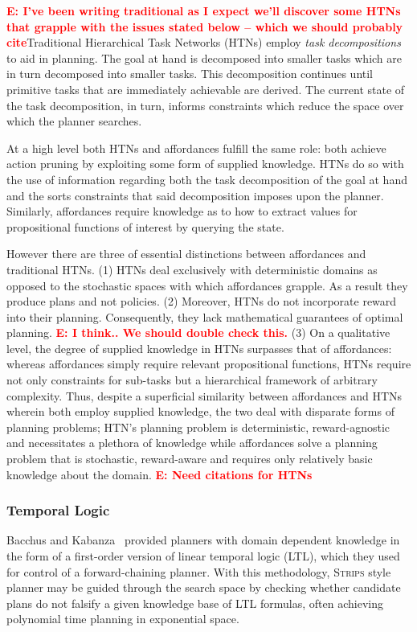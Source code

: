 \documentclass[conference]{IEEEtran}
\newcommand{\enote}[1]{\textcolor{Red}{\textbf{E: #1}}}
\begin{document}
\enote{I've been writing traditional as I expect we'll discover some HTNs that grapple with the issues stated below -- which we should probably cite}Traditional Hierarchical Task Networks (HTNs) employ \textit{task decompositions} to aid in planning. The goal at hand is decomposed into smaller tasks which are in turn decomposed into smaller tasks. This decomposition continues until primitive tasks that are immediately achievable are derived. The current state of the task decomposition, in turn, informs constraints which reduce the space over which the planner searches.

At a high level both HTNs and affordances fulfill the same role: both achieve action pruning by exploiting some form of supplied knowledge. HTNs do so with the use of information regarding both the task decomposition of the goal at hand and the sorts constraints that said decomposition imposes upon the planner. Similarly, affordances require knowledge as to how to extract values for propositional functions of interest by querying the state.

However there are three of essential distinctions between affordances and traditional HTNs. (1) HTNs deal exclusively with deterministic domains as opposed to the stochastic spaces with which affordances grapple. As a result they produce plans and not policies. (2) Moreover, HTNs do not incorporate reward into their planning. Consequently, they lack mathematical guarantees of optimal planning. \enote{I think.. We should double check this.} (3) On a qualitative level, the degree of supplied knowledge in HTNs surpasses that of affordances: whereas affordances simply require relevant propositional functions, HTNs require not only constraints for sub-tasks but a hierarchical framework of arbitrary complexity. Thus, despite a superficial similarity between affordances and HTNs wherein both employ supplied knowledge, the two deal with disparate forms of planning problems; HTN's planning problem is deterministic, reward-agnostic and necessitates a plethora of knowledge while affordances solve a planning problem that is stochastic, reward-aware and requires only relatively basic knowledge about the domain.
\enote{Need citations for HTNs}

\subsubsection{Temporal Logic}

Bacchus and Kabanza~\cite{Bacchus95usingtemporal,Bacchus99usingtemporal} provided
planners with domain dependent knowledge in the form of a first-order version of linear
temporal logic (LTL), which they used for control of a forward-chaining planner. With this methodology, 
\textsc{Strips} style planner may be guided through the search space by checking 
whether candidate plans do not falsify a given knowledge base of LTL formulas, often
achieving polynomial time planning in exponential space.
\end{document}
